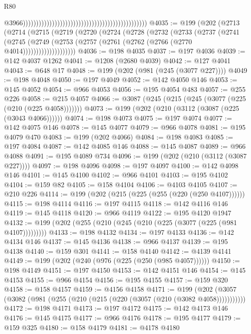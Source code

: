 \begin{lexlean}{R80}
\begin{coremodule}
                                                                                                  @3966)))))))))))))))))))))))))))))))))))))))))))))))
@4035 := @199
    (@202
      (@2713
        (@2714
          (@2715
            (@2719
              (@2720
                (@2724
                  (@2728
                    (@2732
                      (@2733
                        (@2737
                          (@2741
                            (@2745
                              (@2749
                                (@2753 (@2757 (@2761 (@2762 (@2766 (@2770 @4014))))))))))))))))))))
@4036 := @198 @4035
@4037 := @197 @4036
@4039 := @142 @4037 @1262
@4041 := @1208 (@2680 @4039)
@4042 := @127 @4041
@4043 := @648 @17
@4048 := @199 (@202 (@981 (@245 (@3077 @227))))
@4049 := @198 @4048
@4050 := @197 @4049
@4052 := @142 @4050 @146
@4053 := @145 @4052
@4054 := @966 @4053
@4056 := @195 @4054 @483
@4057 := @255 @226
@4058 := @215 @4057
@4066 := @3087 (@245 (@215 (@245 (@3077 (@225 (@210 (@225 @4058)))))))
@4073 := @199 (@202 (@210 (@3112 (@3087 (@225 (@3043 @4066))))))
@4074 := @198 @4073
@4075 := @197 @4074
@4077 := @142 @4075 @146
@4078 := @145 @4077
@4079 := @966 @4078
@4081 := @195 @4079 @470
@4083 := @199 (@202 @4066)
@4084 := @198 @4083
@4085 := @197 @4084
@4087 := @142 @4085 @146
@4088 := @145 @4087
@4089 := @966 @4088
@4091 := @195 @4089 @734
@4096 := @199 (@202 (@210 (@3112 (@3087 @227))))
@4097 := @198 @4096
@4098 := @197 @4097
@4100 := @142 @4098 @146
@4101 := @145 @4100
@4102 := @966 @4101
@4103 := @195 @4102
@4104 := @159 @82
@4105 := @158 @4104
@4106 := @4103 @4105
@4107 := @210 @226
@4114 := @199 (@202 (@215 (@225 (@255 (@220 (@250 @4107))))))
@4115 := @198 @4114
@4116 := @197 @4115
@4118 := @142 @4116 @146
@4119 := @145 @4118
@4120 := @966 @4119
@4122 := @195 @4120 @1947
@4132 := @199 (@202 (@255 (@210 (@245 (@210 (@225 (@3077 (@225 (@981 @4107)))))))))
@4133 := @198 @4132
@4134 := @197 @4133
@4136 := @142 @4134 @146
@4137 := @145 @4136
@4138 := @966 @4137
@4139 := @195 @4138
@4140 := @159 @301
@4141 := @158 @4140
@4142 := @4139 @4141
@4149 := @199 (@202 (@240 (@976 (@225 (@250 (@985 @4057))))))
@4150 := @198 @4149
@4151 := @197 @4150
@4153 := @142 @4151 @146
@4154 := @145 @4153
@4155 := @966 @4154
@4156 := @195 @4155
@4157 := @159 @320
@4158 := @158 @4157
@4159 := @4156 @4158
@4171 := @199 (@202 (@3057 (@3082 (@981 (@255 (@210 (@215 (@220 (@3057 (@210 (@3082 @4058)))))))))))
@4172 := @198 @4171
@4173 := @197 @4172
@4175 := @142 @4173 @146
@4176 := @145 @4175
@4177 := @966 @4176
@4178 := @195 @4177
@4179 := @159 @325
@4180 := @158 @4179
@4181 := @4178 @4180

\end{coremodule}
\end{lexlean}
